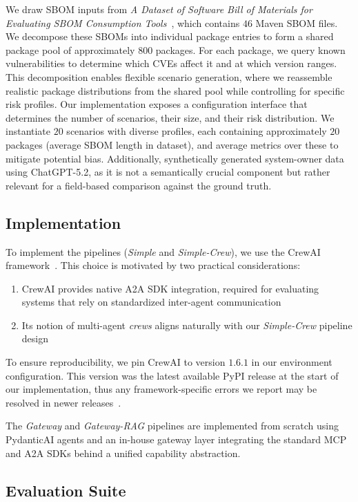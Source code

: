 We draw SBOM inputs from \emph{A Dataset of Software Bill of Materials for Evaluating SBOM Consumption Tools}~\cite{kishimoto2025sbom}, which contains $46$ Maven SBOM files. We decompose these SBOMs into individual package entries to form a shared package pool of approximately $800$ packages. For each package, we query known vulnerabilities to determine which CVEs affect it and at which version ranges. This decomposition enables flexible scenario generation, where we reassemble realistic package distributions from the shared pool while controlling for specific risk profiles. Our implementation exposes a configuration interface that determines the number of scenarios, their size, and their risk distribution. We instantiate $20$ scenarios with diverse profiles, each containing approximately $20$ packages (average SBOM length in dataset), and average metrics over these to mitigate potential bias. Additionally, synthetically generated system-owner data using ChatGPT-5.2, as it is not a semantically crucial component but rather relevant for a field-based comparison against the ground truth.

\subsection{Implementation}

To implement the pipelines (\emph{Simple} and \emph{Simple-Crew}), we use the CrewAI framework~\cite{crewai_docs}.
This choice is motivated by two practical considerations:
\begin{enumerate}
    \item CrewAI provides native A2A SDK integration, required for evaluating systems that rely on standardized inter-agent communication~\cite{crewai_a2a}
    \item Its notion of multi-agent \emph{crews} aligns naturally with our \emph{Simple-Crew} pipeline design
\end{enumerate}
To ensure reproducibility, we pin CrewAI to version $1.6.1$ in our environment configuration.
This version was the latest available PyPI release at the start of our implementation, thus any framework-specific errors we report may be resolved in newer releases~\cite{crewai_pypi}.

The \emph{Gateway} and \emph{Gateway-RAG} pipelines are implemented from scratch using PydanticAI agents and an in-house gateway layer integrating the standard MCP and A2A SDKs behind a unified capability abstraction.

\subsection{Evaluation Suite}

